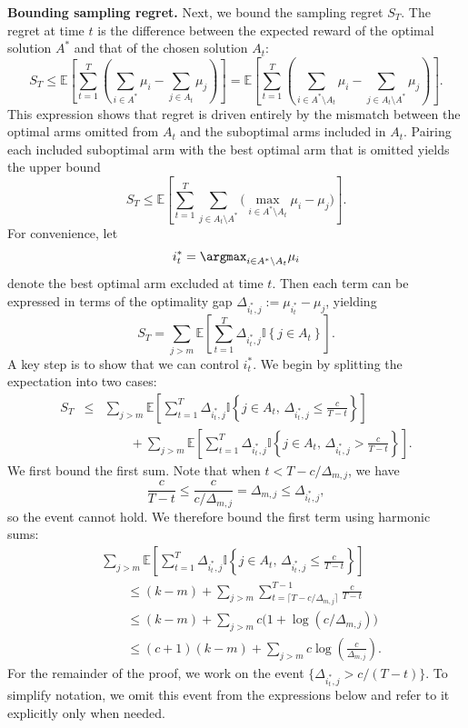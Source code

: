 \documentclass[opre,blindrev]{informs3}
\newcommand{\ind}[1]{\mathbb{I}\left\{#1\right\}}
\newcommand{\bE}[1]{{\mathbb{E}\left[#1\right]}}
\begin{document}
\begin{APPENDICES}
{\bf Bounding sampling regret.}
Next, we bound the sampling regret \(S_T\). The regret at time \(t\) is the difference between the expected reward of the optimal solution \(A^*\) and that of the chosen solution \(A_t\):
\[
    S_T
    \le \bE{\sum_{t=1}^T \left(\sum_{i\in A^*}\mu_i - \sum_{j\in A_t}\mu_j \right)}
    = \bE{\sum_{t=1}^T \left(\sum_{i\in A^*\setminus A_t}\mu_i - \sum_{j\in A_t\setminus A^*}\mu_j \right)}.
\]
This expression shows that regret is driven entirely by the mismatch between the optimal arms omitted from \(A_t\) and the suboptimal arms included in \(A_t\). Pairing each included suboptimal arm with the best optimal arm that is omitted yields the upper bound
\[
    S_T
    \le \bE{\sum_{t=1}^T \sum_{j\in A_t\setminus A^*}
    \Big( \max_{i\in A^*\setminus A_t}\mu_i - \mu_j \Big)}.
\]
For convenience, let
\[
    i_t^* = \argmax_{i\in A^*\setminus A_t}\mu_i
\]
denote the best optimal arm excluded at time \(t\). Then each term can be expressed in terms of the optimality gap \(\Delta_{i_t^*,j} := \mu_{i_t^*} - \mu_j\), yielding
\[
    S_T = \sum_{j>m} \bE{\sum_{t=1}^T \Delta_{i_t^*,j} \ind{j\in A_t}}.
\]
A key step is to show that we can control \(i_t^*\). We begin by splitting the expectation into two cases:
\begin{eqnarray*}
    S_T
    &\le& \sum_{j>m} \bE{\sum_{t=1}^T \Delta_{i_t^*,j} \ind{j\in A_t, \,\Delta_{i_t^*,j}\leq \frac{c}{T-t}}} \\
    &&\qquad + \sum_{j>m} \bE{\sum_{t=1}^T \Delta_{i_t^*,j} \ind{j\in A_t, \,\Delta_{i_t^*,j}> \frac{c}{T-t}}}.
\end{eqnarray*}
We first bound the first sum. Note that when \(t < T-c/\Delta_{m,j}\), we have
\[
    \frac{c}{T-t}\leq \frac{c}{c/\Delta_{m,j}}=\Delta_{m,j}\leq \Delta_{i_t^*,j},
\]
so the event cannot hold. We therefore bound the first term using harmonic sums:
\begin{align*}
    &\sum_{j>m} \bE{\sum_{t=1}^T \Delta_{i_t^*,j} \ind{j\in A_t, \,\Delta_{i_t^*,j}\leq \frac{c}{T-t}}}
    \\
    &\qquad \le (k-m)+\sum_{j>m}\sum_{t=\lceil T-c/\Delta_{m,j}\rceil}^{T-1} \frac{c}{T-t}
    \\
    &\qquad \le (k-m)+\sum_{j>m} c\bigl(1+\log(c/\Delta_{m,j})\bigr)
    \\
    &\qquad \le (c+1)(k-m) +\sum_{j>m}c\log\!\left(\frac{c}{\Delta_{m,j}}\right).
\end{align*}
For the remainder of the proof, we work on the event \(\{\Delta_{i_t^*,j}> c/(T-t)\}\). To simplify notation, we omit this event from the expressions below and refer to it explicitly only when needed.


\end{APPENDICES}
\end{document}
